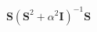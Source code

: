\documentclass[10pt]{article}
\begin{document}
\begin{align*}\boldsymbol S 
\left( \boldsymbol S^2 + \alpha^2 \boldsymbol I \right)^{-1} 
\boldsymbol S\end{align*}
\end{document}

